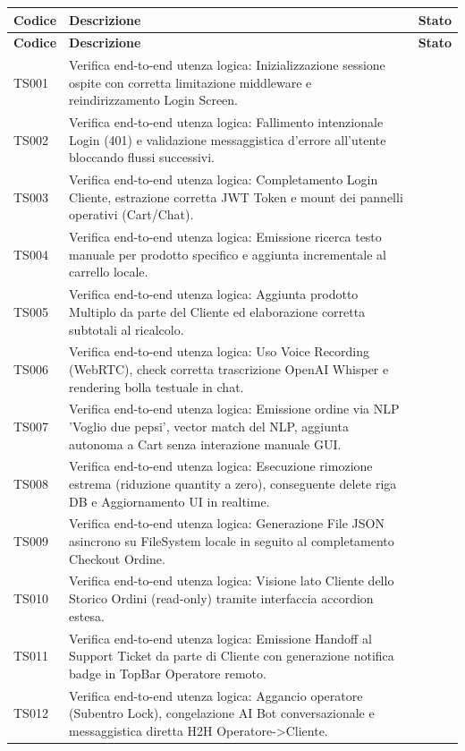 \documentclass[a4paper,11pt,oneside]{scrartcl}
\begin{document}
\begin{longtable}{|p{1.9cm}|p{11.6cm}|c|}
\hline
\rowcolor[gray]{0.9}
\textbf{Codice} & \textbf{Descrizione} & \textbf{Stato} \\
\hline
\endfirsthead
\hline
\rowcolor[gray]{0.9}
\textbf{Codice} & \textbf{Descrizione} & \textbf{Stato} \\
\hline
\endhead
TS001 & Verifica end-to-end utenza logica: Inizializzazione sessione ospite con corretta limitazione middleware e reindirizzamento Login Screen. & \\ \hline
TS002 & Verifica end-to-end utenza logica: Fallimento intenzionale Login (401) e validazione messaggistica d'errore all'utente bloccando flussi successivi. & \\ \hline
TS003 & Verifica end-to-end utenza logica: Completamento Login Cliente, estrazione corretta JWT Token e mount dei pannelli operativi (Cart/Chat). & \\ \hline
TS004 & Verifica end-to-end utenza logica: Emissione ricerca testo manuale per prodotto specifico e aggiunta incrementale al carrello locale. & \\ \hline
TS005 & Verifica end-to-end utenza logica: Aggiunta prodotto Multiplo da parte del Cliente ed elaborazione corretta subtotali al ricalcolo. & \\ \hline
TS006 & Verifica end-to-end utenza logica: Uso Voice Recording (WebRTC), check corretta trascrizione OpenAI Whisper e rendering bolla testuale in chat. & \\ \hline
TS007 & Verifica end-to-end utenza logica: Emissione ordine via NLP 'Voglio due pepsi', vector match del NLP, aggiunta autonoma a Cart senza interazione manuale GUI. & \\ \hline
TS008 & Verifica end-to-end utenza logica: Esecuzione rimozione estrema (riduzione quantity a zero), conseguente delete riga DB e Aggiornamento UI in realtime. & \\ \hline
TS009 & Verifica end-to-end utenza logica: Generazione File JSON asincrono su FileSystem locale in seguito al completamento Checkout Ordine. & \\ \hline
TS010 & Verifica end-to-end utenza logica: Visione lato Cliente dello Storico Ordini (read-only) tramite interfaccia accordion estesa. & \\ \hline
TS011 & Verifica end-to-end utenza logica: Emissione Handoff al Support Ticket da parte di Cliente con generazione notifica badge in TopBar Operatore remoto. & \\ \hline
TS012 & Verifica end-to-end utenza logica: Aggancio operatore (Subentro Lock), congelazione AI Bot conversazionale e messaggistica diretta H2H Operatore->Cliente. & \\ \hline

\end{longtable}
\end{document}

